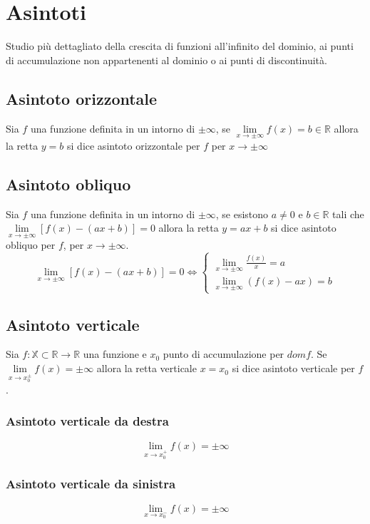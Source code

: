 \chapter{Asintoti}
Studio pi\`u dettagliato della crescita di funzioni all'infinito del dominio, ai punti di accumulazione non appartenenti al dominio o ai punti di discontinuit\`a.
\section{Asintoto orizzontale}
Sia $f$ una funzione definita in un intorno di $\pm\infty$, se $\lim\limits_{x\rightarrow\pm\infty}f(x)=b\in\mathbb{R}$ allora la retta $y=b$ si dice asintoto orizzontale per $f
$ per $x\rightarrow\pm\infty$
\section{Asintoto obliquo}
Sia $f$ una funzione definita in un intorno di $\pm\infty$, se esistono $a\neq 0$ e $b\in\mathbb{R}$ tali che$\lim\limits_{x\rightarrow\pm\infty}[f(x)-(ax+b)]=0$ allora la 
retta $y=ax+b$ si dice asintoto obliquo per $f$, per $x\rightarrow\pm\infty$.
\begin{equation}
\lim\limits_{x\rightarrow\pm\infty}[f(x)-(ax+b)]=0\Leftrightarrow
\begin{cases}
\lim\limits_{x\rightarrow\pm\infty}\frac{f(x)}{x}=a\\
\lim\limits_{x\rightarrow\pm\infty}(f(x)-ax)=b
\end{cases}
\end{equation}
\section{Asintoto verticale}
Sia $f:\mathbb{X}\subset\mathbb{R}\rightarrow\mathbb{R}$ una funzione e $x_0$ punto di accumulazione per $domf$. Se $\lim\limits_{x\rightarrow x_0^\pm}f(x)=\pm\infty$ allora
la retta verticale $x=x_0$ si dice asintoto verticale per $f$.
\subsection{Asintoto verticale da destra}
\begin{equation}
\lim\limits_{x\rightarrow x_0^+}f(x)=\pm\infty
\end{equation}
\subsection{Asintoto verticale da sinistra}
\begin{equation}
\lim\limits_{x\rightarrow x_0^-}f(x)=\pm\infty
\end{equation}